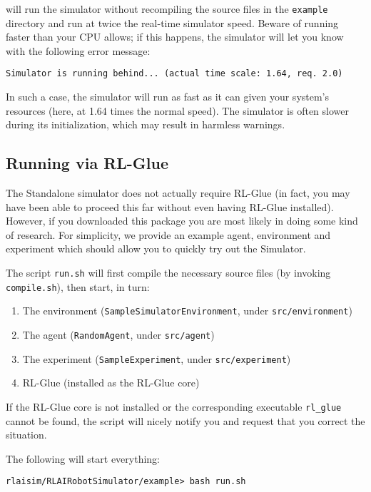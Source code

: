 \documentclass[12pt]{article}
\newcommand{\code}[1]{\texttt{#1}}
\begin{document}
will run the simulator without recompiling the source files in the
\code{example} directory and run at twice the real-time simulator speed.
Beware of running faster than your CPU allows; if this happens, the simulator
will let you know with the following error message:

\begin{verbatim}
Simulator is running behind... (actual time scale: 1.64, req. 2.0)
\end{verbatim}

In such a case, the simulator will run as fast as it can given your system's 
resources (here, at 1.64 times the normal speed). The simulator is often 
slower during its initialization, which may result in harmless warnings.

\subsection{Running via RL-Glue}

The Standalone simulator does not actually require RL-Glue (in fact, you 
may have been able to proceed this far without even having RL-Glue installed).
However, if you downloaded this package you are most likely in doing some
kind of research. For simplicity, we provide an example agent, environment
and experiment which should allow you to quickly try out the Simulator.

The script \code{run.sh} will first compile the necessary source files (by
invoking \code{compile.sh}), then start, in turn:

\begin{enumerate}
\item{The environment (\code{SampleSimulatorEnvironment}, under \code{src/environment})}
\item{The agent (\code{RandomAgent}, under \code{src/agent})}
\item{The experiment (\code{SampleExperiment}, under \code{src/experiment})}
\item{RL-Glue (installed as the RL-Glue core)}
\end{enumerate}

If the RL-Glue core is not installed or the corresponding executable 
\verb+rl_glue+ cannot be found, the script will nicely notify you and request
that you correct the situation.

The following will start everything: 

\begin{verbatim}
rlaisim/RLAIRobotSimulator/example> bash run.sh 
\end{verbatim}
\end{document}
